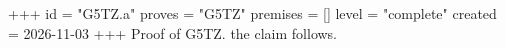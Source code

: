 +++
id = "G5TZ.a"
proves = "G5TZ"
premises = []
level = "complete"
created = 2026-11-03
+++
Proof of G5TZ. the claim follows.
